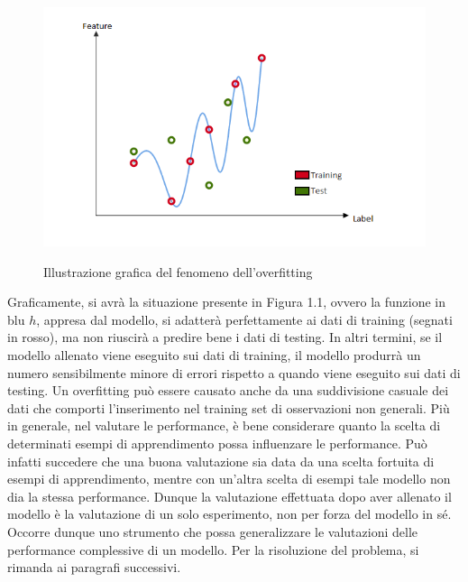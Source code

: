 \documentclass[11pt,  oneside, openany]{book}
\begin{document}
\begin{figure}[h!]
\begin{center}
  \includegraphics[width=13cm]{Immagini/Overfitting.png}\\
  \caption{Illustrazione grafica del fenomeno dell'overfitting}
\end{center}
\end{figure}

Graficamente, si avrà la situazione presente in Figura 1.1, ovvero la funzione in blu $h$, appresa dal modello, si adatterà perfettamente ai dati di training (segnati in rosso), ma non riuscirà a predire bene i dati di testing. In altri termini, se il modello allenato viene eseguito sui dati di training, il modello produrrà un numero sensibilmente minore di errori rispetto a quando viene eseguito sui dati di testing. Un overfitting può essere causato anche da una suddivisione casuale dei dati che comporti l'inserimento nel training set di osservazioni non generali. Più in generale, nel valutare le performance, è bene considerare quanto la scelta di determinati esempi di apprendimento possa influenzare le performance. Può infatti succedere che una buona valutazione sia data da una scelta fortuita di esempi di apprendimento, mentre con un'altra scelta di esempi tale modello non dia la stessa performance. Dunque la valutazione effettuata dopo aver allenato il modello è la valutazione di un solo esperimento, non per forza del modello in sé. Occorre dunque uno strumento che possa generalizzare le valutazioni delle performance complessive di un modello. Per la risoluzione del problema, si rimanda ai paragrafi successivi. 
\end{document}
